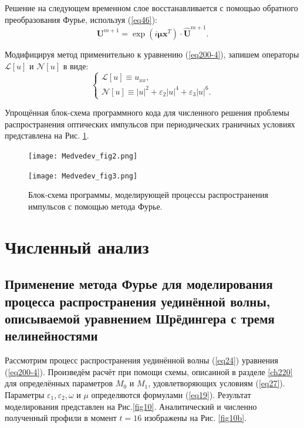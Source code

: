 \documentclass[12pt,a4paper]{article}
\begin{document}
	Решение на следующем временном слое восстанавливается с помощью обратного преобразования Фурье, используя (\ref{eq46}):
	\begin{equation}
		\boldsymbol{U}^{m+1}=\exp\left(i \boldsymbol{\mu} \boldsymbol{x}^{T}\right)\cdot \hat{\boldsymbol{U}}^{m+1}.
	\end{equation}

	Модифицируя метод применительно к уравнению (\ref{eq200-4}), запишем операторы \(\mathscr{L} [u]\) и \(\mathscr{N}[u]\) в виде:
	\begin{equation}
		\begin{cases}
			\mathscr{L} [u] \equiv u_{xx},\\
			\mathscr{N} [u] \equiv |u|^2+ \varepsilon_{2}|u|^4+ \varepsilon_{3}|u|^6.
		\end{cases}
	\end{equation}

	Упрощённая блок-схема программного кода для численного решения проблемы распространения оптических импульсов при периодических граничных условиях представлена на Рис. \ref{fig2}.
	\begin{figure}[H]
		\begin{center}
			\begin{minipage}[h]{0.49\linewidth} %
				\texttt{[image: Medvedev\_fig2.png]}
			\end{minipage}
			\hfill
			\begin{minipage}[h]{0.49\linewidth}
				\texttt{[image: Medvedev\_fig3.png]}
			\end{minipage}
		\end{center}
		\caption{Блок-схема программы, моделирующей процессы распространения импульсов с помощью метода Фурье.}
		\label{fig2}
	\end{figure}
\section{Численный анализ}\label{ch300}
\subsection{Применение метода Фурье для моделирования процесса распространения уединённой волны, описываемой уравнением Шрёдингера с тремя нелинейностями}\label{ch310}
	Рассмотрим процесс распространения уединённой волны (\ref{eq24}) уравнения (\ref{eq200-4}). Произведём расчёт при помощи схемы, описанной в разделе \ref{ch220} для определённых параметров \(M_{0}\) и \(M_{1}\), удовлетворяющих условиям (\ref{eq27}). Параметры \(\varepsilon_{1}\),\,\(\varepsilon_{2}\),\,\(\omega\) и \(\mu\) определяются формулами (\ref{eq19}). Результат моделирования представлен на Рис.\ref{fig10}. Аналитический и численно полученный профили в момент \(t=16\) изображены на Рис. \ref{fig10b}.
\end{document}
